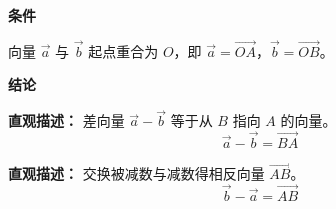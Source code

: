 \begin{statementbox}

	\textbf{\textcolor{CStatement}{条件}}
	\begin{description}[style=nextline, leftmargin=2.8em, labelsep=0.5em, itemsep=0.35em]
		\item[\textbf{\textcolor{CStatement}{条件 1（共起点）：}}] 向量 $\vec{a}$ 与 $\vec{b}$ 起点重合为 $O$，即 $\vec{a}=\overrightarrow{OA}$，$\vec{b}=\overrightarrow{OB}$。
	\end{description}

	\textbf{\textcolor{CStatement}{结论}}
	\begin{description}[style=nextline, leftmargin=2.8em, labelsep=0.5em, itemsep=0.45em]
		\item[\textbf{\textcolor{CStatement}{结论一（差向量公式）：}}]
			\textbf{\textcolor{CStatement}{直观描述：}}
			差向量 $\vec{a}-\vec{b}$ 等于从 $B$ 指向 $A$ 的向量。
			\[
				\boxed{\vec{a}-\vec{b}=\overrightarrow{BA}}
			\]

		\item[\textbf{\textcolor{CStatement}{常见变形（交换顺序）：}}]
			\textbf{\textcolor{CStatement}{直观描述：}}
			交换被减数与减数得相反向量 $\overrightarrow{AB}$。
			\[
				\boxed{\vec{b}-\vec{a}=\overrightarrow{AB}}
			\]
	\end{description}

\end{statementbox}
